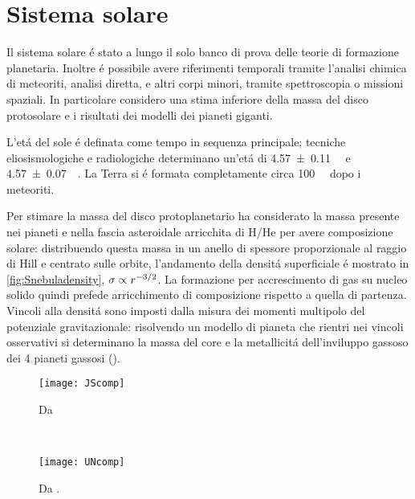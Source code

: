 
{\let\clearpage\relax\let\cleardoublepage\relax
\chapter{Sistema solare}
}
Il sistema solare \'e stato a lungo il solo banco di prova delle teorie di formazione planetaria. Inoltre \'e possibile avere riferimenti temporali tramite l'analisi chimica di meteoriti, analisi diretta, e altri corpi minori, tramite spettroscopia o missioni spaziali. In particolare considero una stima inferiore della massa del disco protosolare e i risultati dei modelli dei pianeti giganti.

L'et\'a del sole \'e definata come tempo in sequenza principale; tecniche eliosismologiche e radiologiche determinano un'et\'a di \SI{4.57+-0.11}{\giga\year} e \SI{4.57+-0.07}{\giga\year}.
La Terra si \'e formata completamente circa \SI{100}{\mega\year} dopo i meteoriti.

Per stimare la massa del disco protoplanetario \cite{weidenschilling1977distribution} ha considerato la massa presente nei pianeti e nella fascia asteroidale arricchita di H/He per avere composizione solare: distribuendo questa massa in un anello di spessore proporzionale al raggio di Hill e centrato sulle orbite, l'andamento della densit\'a superficiale \'e mostrato in \ref{fig:Snebuladensity}, $\sigma\propto r^{-3/2}$.
La formazione per accrescimento di gas su nucleo solido quindi prefede arricchimento di composizione rispetto a quella di partenza. Vincoli alla densit\'a sono imposti dalla misura dei momenti multipolo del potenziale gravitazionale: risolvendo un modello di pianeta che rientri nei vincoli osservativi si determinano la massa del core e la metallicit\'a dell'inviluppo gassoso dei 4 pianeti gassosi ().


\begin{table}[!ht]
\begin{subfigure}[b]{0.47\textwidth}
\centering
\texttt{[image: JScomp]}
\caption{Da \cite{baraffe2009physical}}\label{fig:JScomp}
\end{subfigure}
~
\begin{subfigure}[b]{0.47\textwidth}
\centering
\texttt{[image: UNcomp]}\label{tab:UNcomp}
\caption{Da \cite{baraffe2009physical}.}
\end{subfigure}
\end{table}

